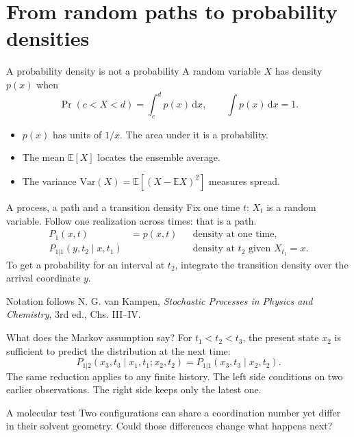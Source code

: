 \documentclass[aspectratio=169,10pt]{beamer}
\newcommand{\E}{\mathbb{E}}
\newcommand{\dd}{\mathrm{d}}
\begin{document}
\section{From random paths to probability densities}
\begin{frame}{A probability density is not a probability}
A random variable $X$ has density $p(x)$ when
\[\Pr(c<X<d)=\int_c^d p(x)\,\dd x,\qquad \int p(x)\,\dd x=1.\]
\begin{itemize}\item $p(x)$ has units of $1/x$. The area under it is a probability.\item The mean $\E[X]$ locates the ensemble average.\item The variance $\mathrm{Var}(X)=\E[(X-\E X)^2]$ measures spread.\end{itemize}
\end{frame}

\begin{frame}{A process, a path and a transition density}
Fix one time $t$: $X_t$ is a random variable. Follow one realization across times: that is a path.
\[
\begin{aligned}
P_1(x,t) &= p(x,t) &&\text{density at one time},\\
P_{1|1}(y,t_2\mid x,t_1) &&&\text{density at }t_2\text{ given }X_{t_1}=x.
\end{aligned}
\]
To get a probability for an interval at $t_2$, integrate the transition density over the arrival coordinate $y$.
\medskip

\footnotesize Notation follows N. G. van Kampen, \emph{Stochastic Processes in Physics and Chemistry}, 3rd ed., Chs. III--IV.
\end{frame}

\begin{frame}{What does the Markov assumption say?}
For $t_1<t_2<t_3$, the present state $x_2$ is sufficient to predict the distribution at the next time:
\[
 P_{1|2}(x_3,t_3\mid x_1,t_1; x_2,t_2)
 =
 P_{1|1}(x_3,t_3\mid x_2,t_2).
\]
The same reduction applies to any finite history. The left side conditions on two earlier observations. The right side keeps only the latest one.
\begin{block}{A molecular test}
Two configurations can share a coordination number yet differ in their solvent geometry. Could those differences change what happens next?
\end{block}
\end{frame}
\end{document}
